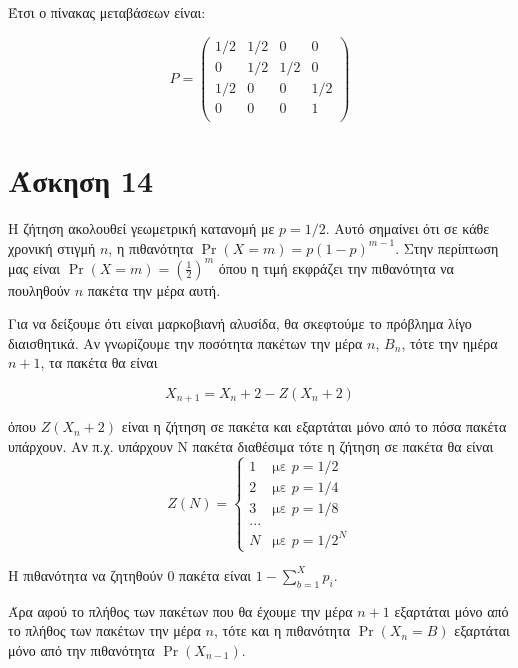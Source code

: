 \documentclass[11pt,a4paper]{article}
\begin{document}
Έτσι ο πίνακας μεταβάσεων είναι:

\begin{equation*}
    P =
    \begin{pmatrix}
        1/2 & 1/2 & 0   & 0   \\
        0   & 1/2 & 1/2 & 0   \\
        1/2 & 0   & 0   & 1/2 \\
        0   & 0   & 0   & 1   \\
    \end{pmatrix}
\end{equation*}

\section*{Άσκηση 14}

Η ζήτηση ακολουθεί γεωμετρική κατανομή με $p=1/2$. Αυτό σημαίνει ότι σε κάθε χρονική στιγμή $n$, η πιθανότητα $\Pr(X=m) = p(1-p)^{m-1}$. Στην περίπτωση μας είναι $\Pr(X=m) = (\frac{1}{2})^m$ όπου η τιμή εκφράζει την πιθανότητα να πουληθούν $n$ πακέτα την μέρα αυτή.

Για να δείξουμε ότι είναι μαρκοβιανή αλυσίδα, θα σκεφτούμε το πρόβλημα λίγο διαισθητικά. Αν γνωρίζουμε την ποσότητα πακέτων την μέρα $n$, $B_n$, τότε την ημέρα $n+1$, τα πακέτα θα είναι

\begin{equation*}
    X_{n+1} = X_n + 2 - Z(X_n + 2)
\end{equation*}

όπου $Z(X_n+2)$ είναι η ζήτηση σε πακέτα και εξαρτάται μόνο από το πόσα πακέτα υπάρχουν. Αν π.χ. υπάρχουν Ν πακέτα διαθέσιμα τότε η ζήτηση σε πακέτα θα είναι
\begin{equation*}
    Z(Ν) =
    \begin{cases}
        1 & \text{με $p = 1/2$}   \\
        2 & \text{με $p = 1/4$}   \\
        3 & \text{με $p = 1/8$}   \\
        ...                       \\
        Ν & \text{με $p = 1/2^N$}
    \end{cases}
\end{equation*}

Η πιθανότητα να ζητηθούν 0 πακέτα είναι $1 - \sum_{b=1}^{X}{p_i}$.

Άρα αφού το πλήθος των πακέτων που θα έχουμε την μέρα $n+1$ εξαρτάται μόνο από το πλήθος των πακέτων την μέρα $n$, τότε και η πιθανότητα $\Pr(X_n = B)$ εξαρτάται μόνο από την πιθανότητα $\Pr(X_{n-1})$.
\end{document}
